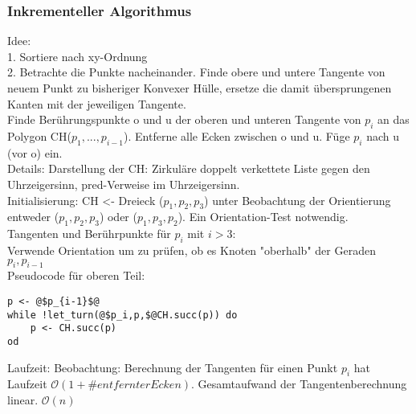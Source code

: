 \documentclass[a4paper]{article}
\newcommand{\oh}[1]{$\mathcal{O}(#1)$}
\begin{document}
\subsubsection{Inkrementeller Algorithmus}
Idee: \\
1. Sortiere nach xy-Ordnung\\
2. Betrachte die Punkte nacheinander. Finde obere und untere Tangente von neuem Punkt zu bisheriger Konvexer Hülle, ersetze die damit übersprungenen Kanten mit der jeweiligen Tangente.\\
Finde Berührungspunkte o und u der oberen und unteren Tangente von $p_i$ an das Polygon CH($p_1,...,p_{i-1}$). Entferne alle Ecken zwischen o und u. Füge $p_i$ nach u (vor o) ein. \\
Details: Darstellung der CH: Zirkuläre doppelt verkettete Liste gegen den Uhrzeigersinn, pred-Verweise im Uhrzeigersinn.\\
Initialisierung: CH <- Dreieck ($p_1,p_2,p_3$) unter Beobachtung der Orientierung entweder ($p_1,p_2,p_3$) oder ($p_1,p_3,p_2$). Ein Orientation-Test notwendig.\\
Tangenten und Berührpunkte für $p_i$  mit $i>3$:\\
Verwende Orientation um zu prüfen, ob es Knoten "oberhalb" der Geraden $p_i,p_{i-1}$\\
Pseudocode für oberen Teil:\\
\begin{lstlisting}[escapechar=@]
p <- @$p_{i-1}$@
while !let_turn(@$p_i,p,$@CH.succ(p)) do
	p <- CH.succ(p)
od
\end{lstlisting}
Laufzeit: Beobachtung: Berechnung der Tangenten für einen Punkt $p_i$ hat Laufzeit \oh{1+\#entfernter Ecken}. Gesamtaufwand der Tangentenberechnung linear. \oh{n}
\end{document}

